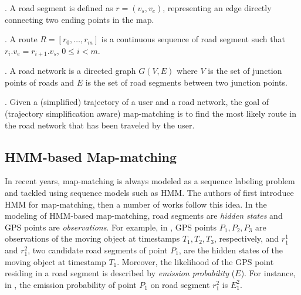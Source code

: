 





. A road segment is defined as $r = (v_s,v_e)$, representing an edge directly connecting two ending
points in the map.




. A route $R = {[r_0, \ldots,r_m]}$ is a continuous sequence
of road segment such that $r_i.v_e = r_{i+1}.v_s$, $0\le i<m$.

. A road network is a directed graph $G(V,E)$ where $V$ is the set of junction points of roads and $E$
is the set of road segments between two junction points.

. Given a (simplified) trajectory of a user and a road network, the goal of (trajectory simplification aware) map-matching is to find the most likely route in the road network that has been traveled by the user.




\subsection{HMM-based Map-matching}
In recent years, map-matching is always modeled as a sequence labeling problem and tackled using sequence models such as HMM.
The authors of \cite{Lamb1999Avoiding} first introduce HMM for map-matching, then a number of works \cite{Newson2009Hidden, Wang:eddy, Osogami:2013:IRL, yin:feature-based} follow this idea.
%
In the modeling of HMM-based map-matching, road segments are \emph{hidden states} and GPS points are \emph{observations}.
For example, in , GPS points $P_1,P_2,P_3$ are observations of the moving object at timestamps $T_1,T_2,T_3$, respectively,
and $r_1^1$ and $r_1^2$, two {candidate road segments} of point $P_1$, are the hidden states of the moving object at timestamp $T_1$.
Moreover, the likelihood of the GPS point residing in a road segment is described by \emph{emission probability} ($E$). For instance, in , the emission probability of point $P_1$ on road segment {$r_1^2$ is $E_1^2$}.

